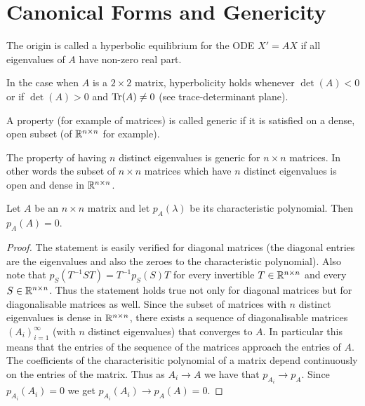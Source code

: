 \section{Canonical Forms and Genericity}\label{sec:canonical-form-and-generiticity}

\begin{definition}[Hyperbolicity]
    The origin is called a hyperbolic equilibrium for the ODE $X' = AX$ if all eigenvalues of $A$ have non-zero real part. 
\end{definition}
In the case when $A$ is a $2 \times 2$ matrix, hyperbolicity holds whenever $\det(A) < 0$ or if $\det(A) > 0$ and $\mathrm{Tr}(A) \neq 0$ (see trace-determinant plane). 

\begin{definition}[Genericity]
    A property (for example of matrices) is called generic if it is satisfied on a dense, open subset (of $\mathbb{R}^{n \times n}$ for example).
\end{definition}

\begin{theorem}
The property of having $n$ distinct eigenvalues is generic for $n \times n$ matrices. In other words the subset of $n \times n$ matrices which have $n$ distinct eigenvalues is open and dense in $\mathbb{R}^{n \times n}$.
\end{theorem}

\begin{corollary}
Let $A$ be an $n \times n$ matrix and let $p_{A}(\lambda)$ be its characteristic polynomial. Then $p_{A}(A) = 0$.
\end{corollary}
\begin{proof}
    The statement is easily verified for diagonal matrices (the diagonal entries are the eigenvalues and also the zeroes to the characteristic polynomial). Also note that $p_{S}(T^{-1}ST) = T^{-1}p_{S}(S)T$ for every invertible $T \in \mathbb{R}^{n \times n}$ and every $S \in \mathbb{R}^{n \times n}$. Thus the statement holds true not only for diagonal matrices but for diagonalisable matrices as well. Since the subset of matrices with $n$ distinct eigenvalues is dense in $\mathbb{R}^{n \times n}$, there exists a sequence of diagonalisable matrices $(A_i)_{i = 1}^{\infty}$ (with $n$ distinct eigenvalues) that converges to $A$. In particular this means that the entries of the sequence of the matrices approach the entries of $A$. The coefficients of the characterisitic polynomial of a matrix depend continuously on the entries of the matrix. Thus as $A_i \to A$ we have that $p_{A_i} \to p_A$. Since $p_{A_i}(A_i) = 0$ we get $p_{A_i}(A_i) \to p_A(A) = 0$.
\end{proof}

